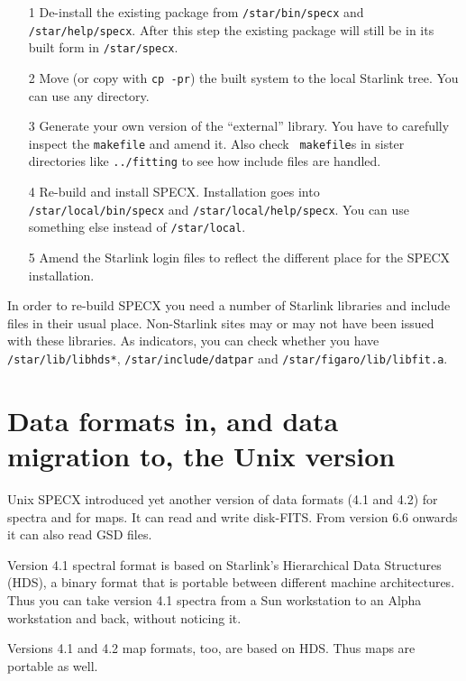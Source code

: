\documentclass[twoside,11pt]{article}
\newcommand{\xref}[3]{#1}
\renewcommand{\_}{\texttt{\symbol{95}}}
\begin{document}
\begin{itemize}
\item[1] De-install the existing package from {\tt /star/bin/specx} and
   {\tt /star/help/specx}. After this step the existing package will
   still be in its built form in {\tt /star/specx}.
\item[2] Move (or copy with {\tt cp -pr}) the built system to the local
   Starlink tree. You can use any directory.
\item[3] Generate your own version of the ``external'' library. You have
   to carefully inspect the {\tt makefile} and amend it. Also check {\tt
   makefile}s in sister directories like {\tt ../fitting} to see how
   include files are handled.
\item[4] Re-build and install SPECX. Installation goes into {\tt
   /star/local/bin/specx} and {\tt /star/\-local/help/specx}. You can use
   something else instead of {\tt /star/local}.
\item[5] Amend the Starlink login files to reflect the different place
   for the SPECX installation.
\end{itemize}

In order to re-build SPECX you need a number of Starlink libraries and
include files in their usual place. Non-Starlink sites may or may not
have been issued with these libraries. As indicators, you can check
whether you have {\tt /star/lib/libhds*}, {\tt /star/include/dat\_par}
and {\tt /star/figaro/lib/libfit.a}.


\section{Data formats in, and data migration to, the Unix version}

Unix SPECX introduced yet another version of data formats (4.1 and 4.2) for
spectra and for maps. It can read and write disk-FITS. From version 6.6
onwards it can also read \xref{GSD}{sun229}{} files.

Version 4.1 spectral format is based on Starlink's Hierarchical Data
Structures (HDS), a binary format that is portable between different
machine architectures. Thus you can take version 4.1 spectra from a Sun
workstation to an Alpha workstation and back, without noticing it.

Versions 4.1 and 4.2 map formats, too, are based on HDS. Thus maps are
portable as well.
\end{document}
